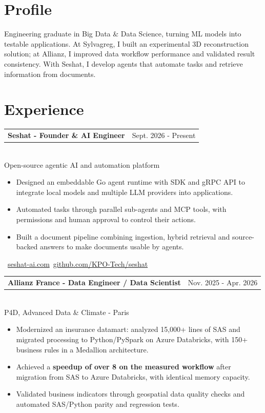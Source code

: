 \documentclass[10pt,a4paper]{article}
\makeatletter
\newcommand{\role}[3]{%
  \vspace{3pt}
  \begin{tabularx}{\linewidth}{@{}Xr@{}}
  \textbf{#1} & {\color{muted}#2}
  \end{tabularx}\vspace{0.8pt}\\
  {\color{muted}#3}\par
  \vspace{3pt}
}
\makeatother
\begin{document}
\begin{lrbox}{\maincolumnbox}
\begin{minipage}[t]{0.695\textwidth}
\vspace{0pt}
\raggedright

\section{Profile}
Engineering graduate in Big Data \& Data Science, turning ML models into testable applications. At Sylvagreg, I built an experimental 3D reconstruction solution; at Allianz, I improved data workflow performance and validated result consistency. With Seshat, I develop agents that automate tasks and retrieve information from documents.

\section{Experience}
\role{Seshat - Founder \& AI Engineer}{Sept. 2026 - Present}{Open-source agentic AI and automation platform}
\begin{itemize}
  \item Designed an embeddable Go agent runtime with SDK and gRPC API to integrate local models and multiple LLM providers into applications.
  \item Automated tasks through parallel sub-agents and MCP tools, with permissions and human approval to control their actions.
  \item Built a document pipeline combining ingestion, hybrid retrieval and source-backed answers to make documents usable by agents.
\end{itemize}
{\footnotesize\color{accent}\ \href{https://seshat-ai.com}{seshat-ai.com}\enspace\textbullet\enspace{}\ \href{https://github.com/KPO-Tech/seshat}{github.com/KPO-Tech/seshat}}\par

\vspace{8pt}
\role{Allianz France - Data Engineer / Data Scientist}{Nov. 2025 - Apr. 2026}{P4D, Advanced Data \& Climate - Paris}
\begin{itemize}
  \item Modernized an insurance datamart: analyzed 15,000+ lines of SAS and migrated processing to Python/PySpark on Azure Databricks, with 150+ business rules in a Medallion architecture.
  \item Achieved a \textbf{speedup of over 8\texttimes{} on the measured workflow} after migration from SAS to Azure Databricks, with identical memory capacity.
  \item Validated business indicators through geospatial data quality checks and automated SAS/Python parity and regression tests.
\end{itemize}


\end{minipage}
\end{lrbox}
\end{document}
